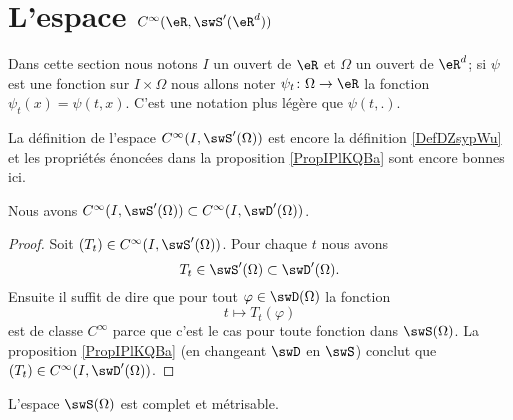 \section{L'espace \texorpdfstring{$  C^{\infty}(\eR,\swS'(\eR^d))$}{C(R,S')}}

Dans cette section nous notons \( I\) un ouvert de \( \eR\) et \( \Omega\) un ouvert de \( \eR^d\); si \( \psi\) est une fonction sur \( I\times \Omega\) nous allons noter \( \psi_t\colon \Omega\to \eR\) la fonction \( \psi_t(x)=\psi(t,x)\). C'est une notation plus légère que \( \psi(t,.)\).

La définition de l'espace \(  C^{\infty}(I,\swS'(\Omega))\) est encore la définition \ref{DefDZsypWu} et les propriétés énoncées dans la proposition \ref{PropIPlKQBa} sont encore bonnes ici.

\begin{lemma}
    Nous avons \(  C^{\infty}(I,\swS'(\Omega))\subset C^{\infty}(I,\swD'(\Omega))\).
\end{lemma}

\begin{proof}
    Soit \( (T_t)\in C^{\infty}(I,\swS'(\Omega))\). Pour chaque \( t\) nous avons
    \begin{equation}
        T_t\in\swS'(\Omega)\subset\swD'(\Omega).
    \end{equation}
    Ensuite il suffit de dire que pour tout \( \varphi\in\swD(\Omega)\) la fonction
    \begin{equation}
        t\mapsto T_t(\varphi)
    \end{equation}
    est de classe \(  C^{\infty}\) parce que c'est le cas pour toute fonction dans \( \swS(\Omega)\). La proposition \ref{PropIPlKQBa} (en changeant \( \swD\) en \( \swS\)) conclut que \( (T_t)\in C^{\infty}(I,\swD'(\Omega))\).
\end{proof}

\begin{proposition} \label{PropIIAcyDq}
    L'espace \( \swS(\Omega)\) est complet et métrisable.
\end{proposition}

